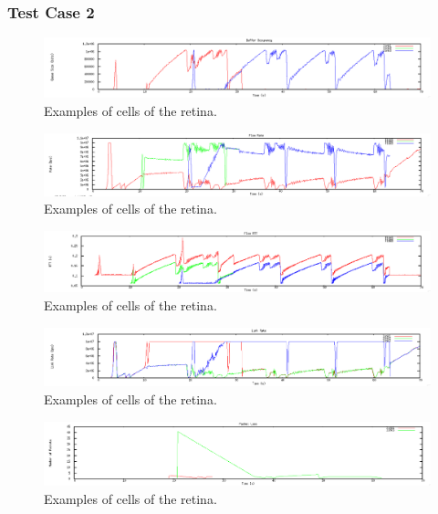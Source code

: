 \documentclass[12pt]{article}
\begin{document}
\subsubsection{Test Case 2}

\begin{figure}[t]
\centering \includegraphics[scale=.35]{figures/Test2_Tahoe/buffer_occ.png}
\caption{Examples of cells of the retina.}
\label{fig:test2_tahoe_buffer_occ}
\end{figure}

\begin{figure}[t]
\centering \includegraphics[scale=.35]{figures/Test2_Tahoe/flow_rate.png}
\caption{Examples of cells of the retina.}
\label{fig:test2_tahoe_flow_rate}
\end{figure}

\begin{figure}[t]
\centering \includegraphics[scale=.35]{figures/Test2_Tahoe/flow_rtt.png}
\caption{Examples of cells of the retina.}
\label{fig:test2_tahoe_flow_rtt}
\end{figure}

\begin{figure}[t]
\centering \includegraphics[scale=.35]{figures/Test2_Tahoe/link_rate.png}
\caption{Examples of cells of the retina.}
\label{fig:test2_tahoe_link_rate}
\end{figure}

\begin{figure}[t]
\centering \includegraphics[scale=.35]{figures/Test2_Tahoe/packet_loss.png}
\caption{Examples of cells of the retina.}
\label{fig:test2_tahoe_packet_loss}
\end{figure}
\end{document}
